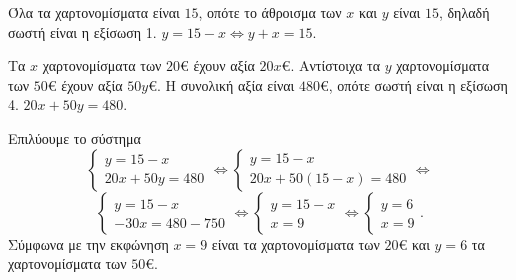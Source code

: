 \begin{alist}
\item
\begin{rlist}
\item Όλα τα χαρτονομίσματα είναι $15$, οπότε το άθροισμα των $x$ και $y$ είναι $15$, δηλαδή σωστή είναι η εξίσωση 1. $y = 15 - x \Leftrightarrow y + x = 15$.
\item Τα $x$ χαρτονομίσματα των $20$\euro{} έχουν αξία $20x$\euro{}. Αντίστοιχα τα $y$ χαρτονομίσματα των $50$\euro{} έχουν αξία $50y$\euro{}. Η συνολική αξία είναι $480$\euro{}, οπότε σωστή είναι η εξίσωση 4. $20x + 50y = 480$.
\end{rlist}
\item Επιλύουμε το σύστημα
\[\begin{cases} y = 15 - x \\ 20x + 50y = 480 \end{cases} \Leftrightarrow \begin{cases} y = 15 - x \\ 20x + 50(15 - x) = 480 \end{cases} \Leftrightarrow\]
\[\begin{cases} y = 15 - x \\ -30x = 480 - 750 \end{cases} \Leftrightarrow \begin{cases} y = 15 - x \\ x = 9 \end{cases} \Leftrightarrow \begin{cases} y = 6 \\ x = 9 \end{cases}.\]
Σύμφωνα με την εκφώνηση $x = 9$ είναι τα χαρτονομίσματα των $20$\euro{} και $y = 6$ τα χαρτονομίσματα των $50$\euro{}.
\end{alist}

